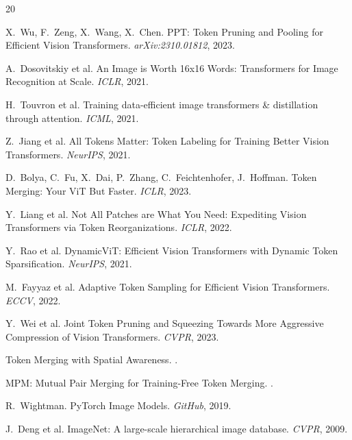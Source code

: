 \documentclass[10pt,twocolumn,letterpaper]{article}
\begin{document}

\begin{thebibliography}{20}

X.~Wu, F.~Zeng, X.~Wang, X.~Chen.
\newblock PPT: Token Pruning and Pooling for Efficient Vision Transformers.
\newblock \textit{arXiv:2310.01812}, 2023.

A.~Dosovitskiy et al.
\newblock An Image is Worth 16x16 Words: Transformers for Image Recognition at Scale.
\newblock \textit{ICLR}, 2021.

H.~Touvron et al.
\newblock Training data-efficient image transformers \& distillation through attention.
\newblock \textit{ICML}, 2021.

Z.~Jiang et al.
\newblock All Tokens Matter: Token Labeling for Training Better Vision Transformers.
\newblock \textit{NeurIPS}, 2021.

D.~Bolya, C.~Fu, X.~Dai, P.~Zhang, C.~Feichtenhofer, J.~Hoffman.
\newblock Token Merging: Your ViT But Faster.
\newblock \textit{ICLR}, 2023.

Y.~Liang et al.
\newblock Not All Patches are What You Need: Expediting Vision Transformers via Token Reorganizations.
\newblock \textit{ICLR}, 2022.

Y.~Rao et al.
\newblock DynamicViT: Efficient Vision Transformers with Dynamic Token Sparsification.
\newblock \textit{NeurIPS}, 2021.

M.~Fayyaz et al.
\newblock Adaptive Token Sampling for Efficient Vision Transformers.
\newblock \textit{ECCV}, 2022.

Y.~Wei et al.
\newblock Joint Token Pruning and Squeezing Towards More Aggressive Compression of Vision Transformers.
\newblock \textit{CVPR}, 2023.

Token Merging with Spatial Awareness.
.

MPM: Mutual Pair Merging for Training-Free Token Merging.
.

R.~Wightman.
\newblock PyTorch Image Models.
\newblock \textit{GitHub}, 2019.

J.~Deng et al.
\newblock ImageNet: A large-scale hierarchical image database.
\newblock \textit{CVPR}, 2009.

\end{thebibliography}
\end{document}
